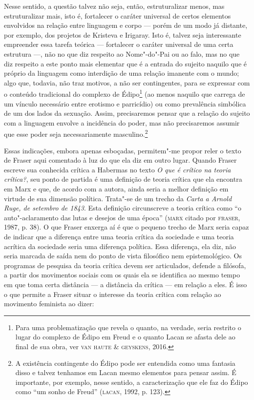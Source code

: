 Nesse sentido, a questão talvez não seja, então, estruturalizar menos,
mas estruturalizar mais, isto é, fortalecer o caráter universal de
certos elementos envolvidos na relação entre linguagem e corpo --- porém
de um modo já distante, por exemplo, dos projetos de Kristeva e
Irigaray. Isto é, talvez seja interessante empreender essa tarefa
teórica --- fortalecer o caráter universal de uma certa estrutura ---, não
no que diz respeito ao Nome"-do"-Pai ou ao falo, mas no que diz respeito a
este ponto mais elementar que é a entrada do sujeito naquilo que é
próprio da linguagem como interdição de uma relação imanente com o
mundo; algo que, todavia, não traz motivos, a não ser contingentes, para
se expressar com o conteúdo tradicional do complexo de Édipo\footnote{Para
  uma problematização que revela o quanto, na verdade, seria restrito o
  lugar do complexo de Édipo em Freud e o quanto Lacan se afasta dele ao
  final de sua obra, ver \textsc{van haute} \& \textsc{geyskens}, 2016.} (ao menos
naquilo que carrega de um vínculo necessário entre erotismo e
parricídio) ou como prevalência simbólica de um dos lados da sexuação.
Assim, precisaremos pensar que a relação do sujeito com a linguagem
envolve a incidência do poder, mas não precisaremos assumir que esse
poder seja necessariamente masculino.\footnote{A existência contingente
  do Édipo pode ser entendida como uma fantasia disso e talvez tenhamos
  em Lacan mesmo elementos para pensar assim. É importante, por exemplo,
  nesse sentido, a caracterização que ele faz do Édipo como ``um sonho
  de Freud'' (\textsc{lacan}, 1992, p. 123).}

Essas indicações, embora apenas esboçadas, permitem"-me propor reler o
texto de Fraser aqui comentado à luz do que ela diz em outro lugar.
Quando Fraser escreve sua conhecida crítica a Habermas no texto \emph{O
que é crítico na teoria crítica?}, seu ponto de partida é uma definição
de teoria crítica que ela encontra em Marx e que, de acordo com a
autora, ainda seria a melhor definição em virtude de sua dimensão
política. Trata"-se de um trecho da \emph{Carta a Arnold Ruge, de
setembro de 1843}. Esta definição circunscreve a teoria crítica como ``o
auto"-aclaramento das lutas e desejos de uma época'' (\textsc{marx} citado por
\textsc{fraser}, 1987, p. 38). O que Fraser enxerga aí é que o pequeno trecho
de Marx seria capaz de indicar que a diferença entre uma teoria crítica
da sociedade e uma teoria acrítica da sociedade seria uma diferença
política. Essa diferença, ela diz, não seria marcada de saída nem do
ponto de vista filosófico nem epistemológico. Os programas de pesquisa
da teoria crítica devem ser articulados, defende a filósofa, a partir
dos movimentos sociais com os quais ela se identifica ao mesmo tempo em
que toma certa distância --- a distância da crítica --- em relação a eles.
É isso o que permite a Fraser situar o interesse da teoria crítica com
relação ao movimento feminista ao dizer:

